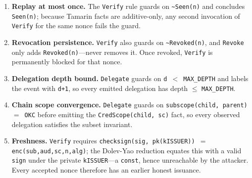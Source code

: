 \documentclass[10pt,twocolumn]{IEEEtran}
\begin{document}
\begin{enumerate}
  \item[\textbf{S1}] \textbf{Replay at most once.} The \texttt{Verify}
        rule guards on \texttt{\textasciitilde Seen(n)} and concludes
        \texttt{Seen(n)}; because Tamarin facts are additive-only,
        any second invocation of \texttt{Verify} for the same nonce
        fails the guard.
  \item[\textbf{S2}] \textbf{Revocation persistence.} \texttt{Verify}
        also guards on \texttt{\textasciitilde Revoked(n)}, and
        \texttt{Revoke} only adds \texttt{Revoked(n)}---never removes
        it. Once revoked, \texttt{Verify} is permanently blocked for
        that nonce.
  \item[\textbf{S3}] \textbf{Delegation depth bound.} \texttt{Delegate}
        guards on \texttt{d $<$ MAX\_DEPTH} and labels the event with
        \texttt{d+1}, so every emitted delegation has depth
        $\le$ \texttt{MAX\_DEPTH}.
  \item[\textbf{S4}] \textbf{Chain scope convergence.} \texttt{Delegate}
        guards on \texttt{subscope(child, parent) $=$ OKC} before
        emitting the \texttt{CredScope(child, sc)} fact, so every
        observed delegation satisfies the subset invariant.
  \item[\textbf{S5}] \textbf{Freshness.} \texttt{Verify} requires
        \texttt{checksign(sig, pk(kISSUER)) $=$ enc(sub,aud,sc,n,alg)};
        the Dolev-Yao reduction equates this with a valid
        \texttt{sign} under the private \texttt{kISSUER}---a
        \texttt{const}, hence unreachable by the attacker. Every
        accepted nonce therefore has an earlier honest issuance.
\end{enumerate}
\end{document}
